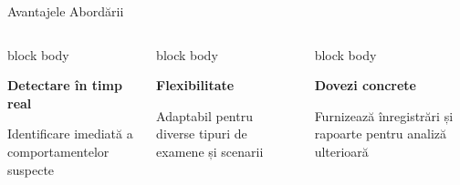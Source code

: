 \documentclass[aspectratio=169,9pt]{beamer}
\begin{document}
\begin{frame}{Avantajele Abordării}
\begin{columns}[T]
\begin{beamercolorbox}[rounded=true,shadow=true,sep=1em]{block body}
\begin{center}
                                        \textbf{Detectare în timp real}
                                        \vspace{0.1cm}
                                        
                                        \small Identificare imediată a comportamentelor suspecte
                                \end{center}
                        \end{beamercolorbox}
                        
                        \vspace{0.4cm}
                        
                        \begin{beamercolorbox}[rounded=true,shadow=true,sep=1em]{block body}
                                \begin{center}
                                        {\fontsize{24}{24}\selectfont\textcolor{mainblue}{\faRandom}}
                                        \vspace{0.2cm}
                                        
                                        \textbf{Flexibilitate}
                                        \vspace{0.1cm}
                                        
                                        \small Adaptabil pentru diverse tipuri de examene și scenarii
                                \end{center}
                        \end{beamercolorbox}
                        
                        \begin{beamercolorbox}[rounded=true,shadow=true,sep=1em]{block body}
                                \begin{center}
                                        {\fontsize{24}{24}\selectfont\textcolor{mainblue}{\faClipboardList}}
                                        \vspace{0.2cm}
                                        
                                        \textbf{Dovezi concrete}
                                        \vspace{0.1cm}
                                        
                                        \small Furnizează înregistrări și rapoarte pentru analiză ulterioară
                                \end{center}
                        \end{beamercolorbox}
                        

\end{columns}
\end{frame}
\end{document}
